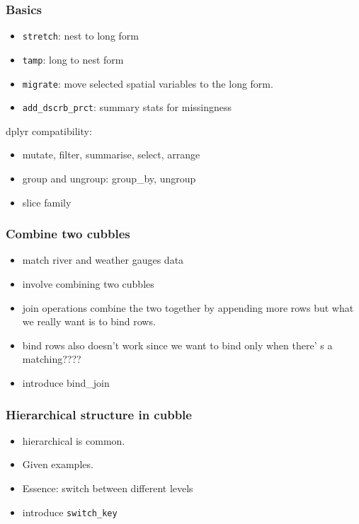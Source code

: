 \documentclass[
]{jss}
\providecommand{\tightlist}{%
  \setlength{\itemsep}{0pt}\setlength{\parskip}{0pt}}
\begin{document}
\hypertarget{basics}{%
\subsubsection{Basics}\label{basics}}

\begin{itemize}
\tightlist
\item
  \texttt{stretch}: nest to long form
\item
  \texttt{tamp}: long to nest form
\item
  \texttt{migrate}: move selected spatial variables to the long form.
\item
  \texttt{add\_dscrb\_prct}: summary stats for missingness
\end{itemize}

dplyr compatibility:

\begin{itemize}
\tightlist
\item
  mutate, filter, summarise, select, arrange
\item
  group and ungroup: group\_by, ungroup
\item
  slice family
\end{itemize}

\hypertarget{combine-two-cubbles}{%
\subsubsection{Combine two cubbles}\label{combine-two-cubbles}}

\begin{itemize}
\tightlist
\item
  match river and weather gauges data
\item
  involve combining two cubbles
\item
  join operations combine the two together by appending more rows but
  what we really want is to bind rows.
\item
  bind rows also doesn't work since we want to bind only when there' s a
  matching????
\item
  introduce bind\_join
\end{itemize}

\hypertarget{hierarchical-structure-in-cubble}{%
\subsubsection{Hierarchical structure in
cubble}\label{hierarchical-structure-in-cubble}}

\begin{itemize}
\tightlist
\item
  hierarchical is common.
\item
  Given examples.
\item
  Essence: switch between different levels
\item
  introduce \texttt{switch\_key}
\end{itemize}
\end{document}
